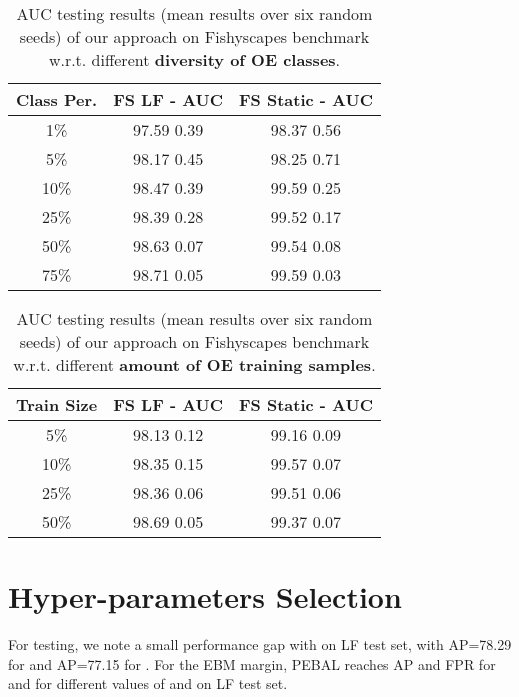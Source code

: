 \documentclass[runningheads]{llncs}
\begin{document}
\begin{table}[h]
\centering
\begin{tabular}{@{}c c c@{}}
\toprule 
 Class Per.  & FS LF - AUC  & FS Static - AUC \\ \hline \hline
1\%     & 97.59 {0.39}      & 98.37 {0.56}\\
5\%     & 98.17 {0.45}      & 98.25 {0.71}\\
10\%     & 98.47 {0.39}   & 99.59 {0.25} \\
25\%       & 98.39 {0.28}     & 99.52 {0.17} \\ 
50\%  & 98.63 {0.07}       & 99.54 {0.08} \\
75\%   & 98.71 {0.05}   &  99.59 {0.03} \\ 
 \bottomrule 
\end{tabular}\caption{AUC testing results (mean results over six random seeds) of our approach on Fishyscapes benchmark w.r.t. different \textbf{diversity of OE classes}.
}
\label{tab:auc_class_per}
\end{table}




\begin{table}[h]
\centering
\begin{tabular}{@{}c c c@{}}
\toprule
 Train Size  & FS LF - AUC  & FS Static - AUC \\ \hline \hline
5\%     & 98.13 {0.12}      & 99.16 {0.09}\\
10\%     & 98.35 {0.15}   & 99.57 {0.07} \\
25\%       & 98.36 {0.06}     & 99.51 {0.06} \\ 
50\%  & 98.69 {0.05}       & 99.37 {0.07} \\
 \bottomrule
\end{tabular}\caption{{AUC testing results (mean results over six random seeds) of our approach on Fishyscapes benchmark w.r.t. different \textbf{amount of OE training samples}.}
}
\label{tab:auc_train_set}
\end{table}


\section{Hyper-parameters Selection}
For testing, we note a small performance gap with  
on LF test set, with AP=78.29 for  and AP=77.15 for .  
For the EBM margin, PEBAL reaches AP
and FPR for  and   
for different values of  and  on LF test set.
\end{document}
